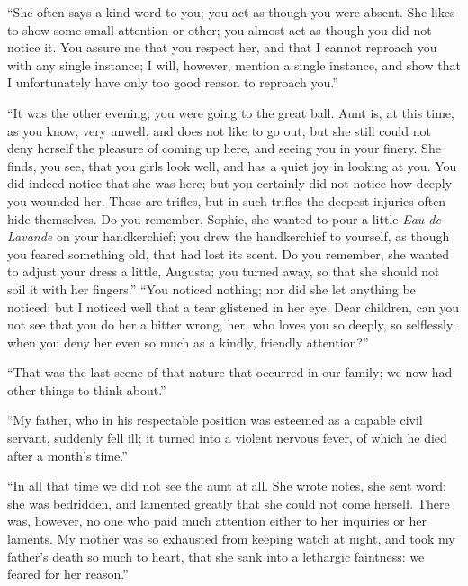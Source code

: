 \documentclass[12pt,a4paper]{book}
\begin{document}
``She often says a kind word to you; you act as though you were absent. She likes to show some small attention or other; you almost act as though you did not notice it. You assure me that you respect her, and that I cannot reproach you with any single instance; I will, however, mention a single instance, and show that I unfortunately have only too good reason to reproach you.''

``It was the other evening; you were going to the great ball. Aunt is, at this time, as you know, very unwell, and does not like to go out, but she still could not deny herself the pleasure of coming up here, and seeing you in your finery. She finds, you see, that you girls look well, and has a quiet joy in looking at you. You did indeed notice that she was here; but you certainly did not notice how deeply you wounded her. These are trifles, but in such trifles the deepest injuries often hide themselves. Do you remember, Sophie, she wanted to pour a little \textit{Eau de Lavande} on your handkerchief; you drew the handkerchief to yourself, as though you feared something old, that had lost its scent. Do you remember, she wanted to adjust your dress a little, Augusta; you turned away, so that she should not soil it with her fingers.''
``You noticed nothing; nor did she let anything be noticed; but I noticed well that a tear glistened in her eye. Dear children, can you not see that you do her a bitter wrong, her, who loves you so deeply, so selflessly, when you deny her even so much as a kindly, friendly attention?''

``That was the last scene of that nature that occurred in our family; we now had other things to think about.''

``My father, who in his respectable position was esteemed as a capable civil servant, suddenly fell ill; it turned into a violent nervous fever, of which he died after a month's time.''

``In all that time we did not see the aunt at all. She wrote notes, she sent word: she was bedridden, and lamented greatly that she could not come herself. There was, however, no one who paid much attention either to her inquiries or her laments. My mother was so exhausted from keeping watch at night, and took my father's death so much to heart, that she sank into a lethargic faintness: we feared for her reason.''
\end{document}
